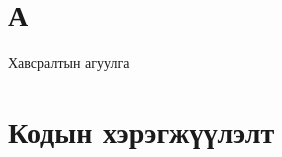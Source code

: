 \documentclass[12pt,A4]{report}
\begin{document}
\appendix
{}

\chapter{А}
Хавсралтын агуулга

\chapter{Кодын хэрэгжүүлэлт}
\end{document}
